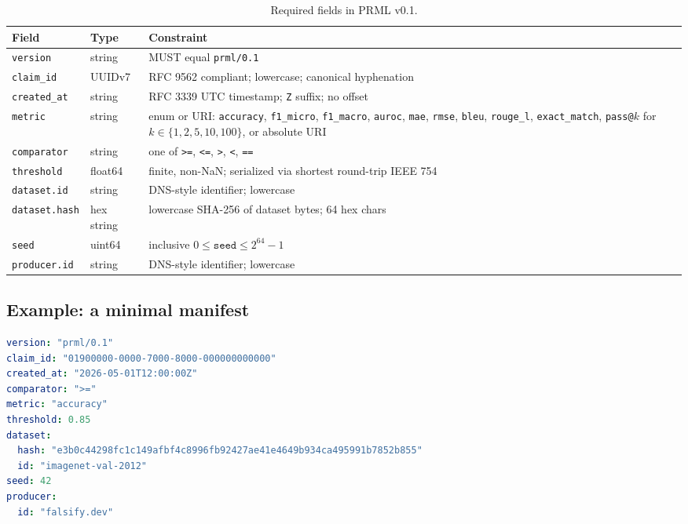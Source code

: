 \documentclass[11pt, a4paper]{article}
\begin{document}
\begin{table}[h]
\centering
\small
\begin{tabular}{@{}p{3.0cm} p{2.0cm} p{8.5cm}@{}}
\toprule
Field & Type & Constraint \\
\midrule
\texttt{version} & string & MUST equal \texttt{prml/0.1} \\
\texttt{claim\_id} & UUIDv7~\cite{rfc9562} & RFC 9562 compliant; lowercase; canonical hyphenation \\
\texttt{created\_at} & string & RFC 3339 UTC timestamp; \texttt{Z} suffix; no offset \\
\texttt{metric} & string & enum or URI: \texttt{accuracy}, \texttt{f1\_micro}, \texttt{f1\_macro}, \texttt{auroc}, \texttt{mae}, \texttt{rmse}, \texttt{bleu}, \texttt{rouge\_l}, \texttt{exact\_match}, \texttt{pass@}$k$ for $k \in \{1,2,5,10,100\}$, or absolute URI \\
\texttt{comparator} & string & one of \texttt{>=}, \texttt{<=}, \texttt{>}, \texttt{<}, \texttt{==} \\
\texttt{threshold} & float64 & finite, non-NaN; serialized via shortest round-trip IEEE 754 \\
\texttt{dataset.id} & string & DNS-style identifier; lowercase \\
\texttt{dataset.hash} & hex string & lowercase SHA-256 of dataset bytes; 64 hex chars \\
\texttt{seed} & uint64 & inclusive $0 \leq \texttt{seed} \leq 2^{64}-1$ \\
\texttt{producer.id} & string & DNS-style identifier; lowercase \\
\bottomrule
\end{tabular}
\caption{Required fields in PRML v0.1.}
\label{tab:required-fields}
\end{table}

\subsection{Example: a minimal manifest}

\begin{lstlisting}[language=yaml, caption={Minimal PRML v0.1 manifest, eight required fields, canonical form.}]
version: "prml/0.1"
claim_id: "01900000-0000-7000-8000-000000000000"
created_at: "2026-05-01T12:00:00Z"
comparator: ">="
metric: "accuracy"
threshold: 0.85
dataset:
  hash: "e3b0c44298fc1c149afbf4c8996fb92427ae41e4649b934ca495991b7852b855"
  id: "imagenet-val-2012"
seed: 42
producer:
  id: "falsify.dev"
\end{lstlisting}
\end{document}
